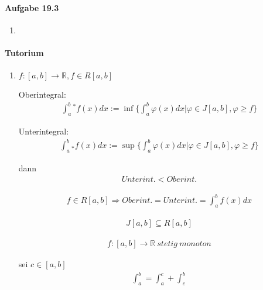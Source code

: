 \documentclass[11pt,a4paper]{article}
\begin{document}
\paragraph{Aufgabe 19.3}

\begin{enumerate}

\item[]



\end{enumerate}

\newpage

\paragraph{Tutorium}

\begin{enumerate}

\item[]

$f:[a,b]\rightarrow\mathbb{R},f\in R[a,b]$

Oberintegral:
\begin{align*}
\int_a^b {}^* f(x)dx:=\inf\{\int_a^b\varphi(x)dx|\varphi\in J[a,b],\varphi\geq f\}
\end{align*}

Unterintegral:
\begin{align*}
\int_a^b {}_* f(x)dx:=\sup\{\int_a^b\varphi(x)dx|\varphi\in J[a,b],\varphi\geq f\}
\end{align*}

dann
\begin{align*}
Unterint.<Oberint.
\end{align*}

\begin{align*}
f\in R[a,b]\Rightarrow Oberint.=Unterint.=\int_a^b f(x)dx
\end{align*}

\begin{align*}
J[a,b]\subseteq R[a,b]
\end{align*}

\begin{align*}
f:[a,b]\rightarrow\mathbb{R}\ stetig\ monoton
\end{align*}

sei $c\in[a,b]$
\begin{align*}
\int_a^b=\int_a^c+\int_c^b
\end{align*}

\end{enumerate}
\end{document}

